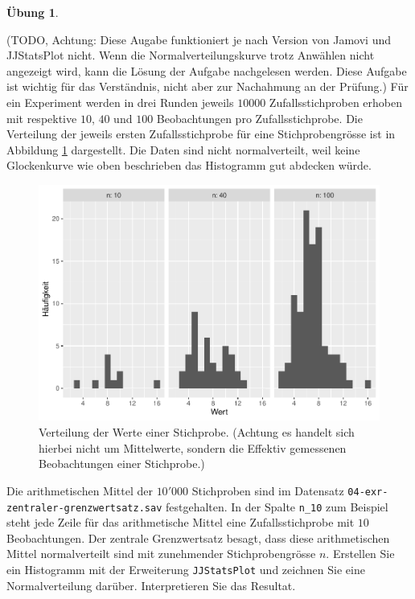 \documentclass[
]{book}
\theoremstyle{definition}
\theoremstyle{definition}
\theoremstyle{definition}
\newtheorem{exercise}{Übung}[chapter]
\theoremstyle{definition}
\theoremstyle{remark}
\begin{document}
\begin{exercise}
\protect\hypertarget{exr:ki-approx-normal}{}\label{exr:ki-approx-normal}\leavevmode

(TODO, Achtung: Diese Augabe funktioniert je nach Version von Jamovi und JJStatsPlot nicht. Wenn die Normalverteilungskurve trotz Anwählen nicht angezeigt wird, kann die Lösung der Aufgabe nachgelesen werden. Diese Aufgabe ist wichtig für das Verständnis, nicht aber zur Nachahmung an der Prüfung.) Für ein Experiment werden in drei Runden jeweils \(10000\) Zufallsstichproben erhoben mit respektive \(10\), \(40\) und \(100\) Beobachtungen pro Zufallsstichprobe. Die Verteilung der jeweils ersten Zufallsstichprobe für eine Stichprobengrösse ist in Abbildung \ref{fig:ki-approx-normal1} dargestellt. Die Daten sind nicht normalverteilt, weil keine Glockenkurve wie oben beschrieben das Histogramm gut abdecken würde.

\begin{figure}

{\centering \includegraphics{aps_statistik1_files/figure-latex/ki-approx-normal1-1} 

}

\caption{Verteilung der Werte einer Stichprobe. (Achtung es handelt sich hierbei nicht um Mittelwerte, sondern die Effektiv gemessenen Beobachtungen einer Stichprobe.)}\label{fig:ki-approx-normal1}
\end{figure}

Die arithmetischen Mittel der \(10'000\) Stichproben sind im Datensatz \texttt{04-exr-zentraler-grenzwertsatz.sav} festgehalten. In der Spalte \texttt{n\_10} zum Beispiel steht jede Zeile für das arithmetische Mittel eine Zufallsstichprobe mit \(10\) Beobachtungen. Der zentrale Grenzwertsatz besagt, dass diese arithmetischen Mittel normalverteilt sind mit zunehmender Stichprobengrösse \(n\). Erstellen Sie ein Histogramm mit der Erweiterung \texttt{JJStatsPlot} und zeichnen Sie eine Normalverteilung darüber. Interpretieren Sie das Resultat.

\end{exercise}
\end{document}
